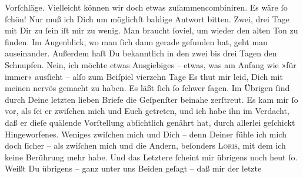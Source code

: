 \begin{ledgroupsized}[t]{13cm}
               Vorſchläge. Vielleicht können wir {\pb}doch etwas
               zuſammencombiniren. Es wäre ſo ſchön! Nur muß ich Dich um möglichſt baldige Antwort
               bitten. Zwei, drei Tage mit Dir zu ſein iſt mir zu wenig. Man braucht ſoviel, um
               wieder den alten Ton zu finden. Im Augenblick, wo man ſich \strikeout{\textcolor{gray}{a}} dann gerade gefunden hat, geht man auseinander. Außerdem haſt Du bekanntlich
               in den zwei bis drei Tagen den Schnupfen. Nein, ich möchte etwas Ausgiebiges – etwas,
               was am Anfang wie »für immer« ausſieht – alſo zum Beiſpiel vierzehn Tage{\dotsfive}\pend
           \pstart
           Es thut mir leid, Dich {\pb}mit meinen \label{K_L02627-5v}\label{K_L02627-5h} nervös gemacht zu haben. Es läßt ſich ſo ſchwer ſagen. Im Übrigen ſind durch
               Deine letzten lieben Briefe die Geſpenſter beinahe zerſtreut. Es kam mir ſo vor, als
               ſei er zwiſchen mich und Euch getreten, und ich habe ihn im
               Verdacht, daß er dieſe quälende Vorſtellung abſichtlich genährt hat, durch  allerlei geſchickt Hingeworfenes. Weniges zwiſchen
               mich und Dich – denn Deiner fühle {\pb}ich mich doch
               ſicher – als zwiſchen mich und die Andern, beſonders \textsc{Loris}, mit dem ich keine Berührung mehr habe. Und das Letztere ſcheint mir übrigens
               noch heut ſo.\pend
           \pstart
           Weißt Du übrigens – ganz unter uns Beiden geſagt – daß mir der letzte \label{K_L02627-6v}
\end{ledgroupsized}
